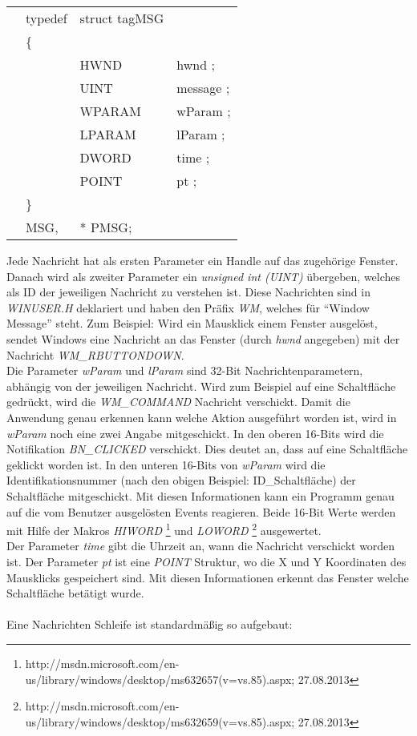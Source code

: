 \begin{tabular}{llll}
& typedef & struct tagMSG\\
& \{\\
&  & HWND   & hwnd ;\\
&  & UINT   & message ;\\
&  & WPARAM & wParam ;\\
&  & LPARAM & lParam ;\\
&  & DWORD  & time ;\\
&  & POINT  & pt ;\\
& \}\\
& MSG,&* PMSG;\\
\end{tabular}

Jede Nachricht hat als ersten Parameter ein Handle auf das zugehörige Fenster. Danach wird als zweiter Parameter ein \textit{unsigned int (UINT)} übergeben, welches als ID der jeweiligen Nachricht zu verstehen ist. Diese Nachrichten sind in \textit{WINUSER.H} deklariert und haben den Präfix \textit{WM}, welches für "`Window Message"' steht. Zum Beispiel: Wird ein Mausklick einem Fenster ausgelöst, sendet Windows eine Nachricht an das Fenster (durch \textit{hwnd} angegeben) mit der Nachricht \textit{WM\_RBUTTONDOWN}.\\

Die Parameter \textit{wParam} und \textit{lParam} sind 32-Bit Nachrichtenparametern, abhängig von der jeweiligen Nachricht. Wird zum Beispiel auf eine Schaltfläche gedrückt, wird die \textit{WM\_COMMAND} Nachricht verschickt. Damit die Anwendung genau erkennen kann welche Aktion ausgeführt worden ist, wird in \textit{wParam} noch eine zwei Angabe mitgeschickt. In den oberen 16-Bits wird die Notifikation \textit{BN\_CLICKED} verschickt. Dies deutet an, dass auf eine Schaltfläche geklickt worden ist. In den unteren 16-Bits von \textit{wParam} wird die Identifikationsnummer (nach den obigen Beispiel: ID\_Schaltfläche) der Schaltfläche mitgeschickt. Mit diesen Informationen kann ein Programm genau auf die vom Benutzer ausgelösten Events reagieren. Beide 16-Bit Werte werden mit Hilfe der Makros \textit{HIWORD} \footnote{http://msdn.microsoft.com/en-us/library/windows/desktop/ms632657(v=vs.85).aspx; 27.08.2013} und \textit{LOWORD} \footnote{http://msdn.microsoft.com/en-us/library/windows/desktop/ms632659(v=vs.85).aspx; 27.08.2013} ausgewertet.\\

Der Parameter \textit{time} gibt die Uhrzeit an, wann die Nachricht verschickt worden ist. Der Parameter \textit{pt} ist eine \textit{POINT} Struktur, wo die X und Y Koordinaten des Mausklicks gespeichert sind. Mit diesen Informationen erkennt das Fenster welche Schaltfläche betätigt wurde.
\\\\
Eine Nachrichten Schleife ist standardmäßig so aufgebaut:

